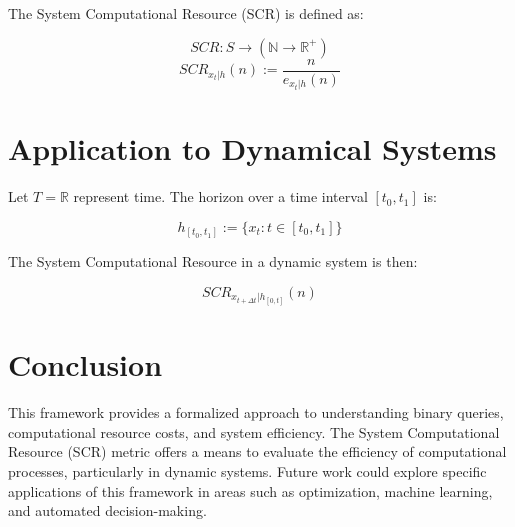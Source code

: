 \documentclass[11pt,a4paper]{article}
\theoremstyle{definition}
\theoremstyle{remark}
\numberwithin{equation}{section}
\begin{document}
The System Computational Resource (SCR) is defined as:

\[
SCR : S \rightarrow (\mathbb{N} \rightarrow \mathbb{R}^+)
\]
\[
SCR_{x_t|h}(n) := \frac{n}{e_{x_t|h}(n)}
\]

\section{Application to Dynamical Systems}

Let $T = \mathbb{R}$ represent time. The horizon over a time interval $[t_0, t_1]$ is:

\[
h_{[t_0, t_1]} := \{ x_t : t \in [t_0, t_1] \}
\]

The System Computational Resource in a dynamic system is then:

\[
SCR_{x_{t+\Delta t} | h_{[0,t]}}(n)
\]

\section{Conclusion}

This framework provides a formalized approach to understanding binary queries, computational resource costs, and system efficiency. The System Computational Resource (SCR) metric offers a means to evaluate the efficiency of computational processes, particularly in dynamic systems. Future work could explore specific applications of this framework in areas such as optimization, machine learning, and automated decision-making.



\end{document}
